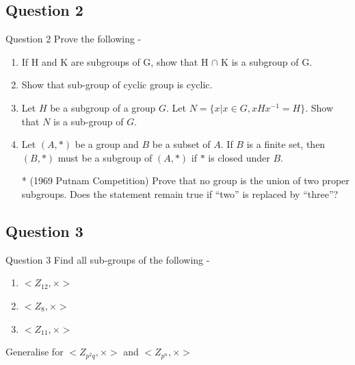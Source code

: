 \documentclass[xcolor=svgnames]{beamer}
\begin{document}
\subsection{Question 2}
\begin{frame}{Question 2}
 Prove the following - 
\begin{enumerate}
    \item If H and K are subgroups of G, show that H $\cap$ K is a subgroup of G.
    \item Show that sub-group of cyclic group is cyclic.
    \item Let $H$ be a subgroup of a group $G$. Let $N = \{x | x \in G, xHx^{-1} = H\}$. Show that $N$ is a sub-group of $G$.
    \item Let $(A,*)$ be a group and $B$ be a subset of $A$. If $B$ is a finite set, then $(B,*)$ must be a subgroup of $(A,*)$ if $*$ is closed under $B$.
    \item [*] (1969 Putnam Competition) Prove that no group is the union of two
proper subgroups. Does the statement remain true if “two” is
replaced by “three”?
\end{enumerate}  
\end{frame}
 

\subsection{Question 3}


\begin{frame}{Question 3}
Find all sub-groups of the following - 
\begin{enumerate}
    \item $<Z_{12},\times>$
    \item $<Z_{8},\times>$
    \item $<Z_{11},\times>$
\end{enumerate}
Generalise for $<Z_{p^2q},\times>$ and $<Z_{p^n},\times>$
\end{frame}
\end{document}
